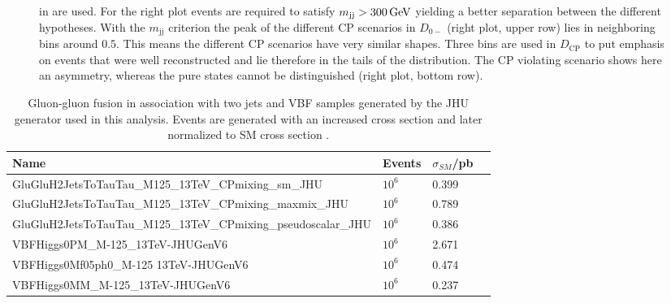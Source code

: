 \begin{figure}[h!]
{   in  are used. For the right plot events are required to satisfy $m_\text{jj}>\text{300\,{GeV}}$ yielding a better separation between the different hypotheses.
   With the $m_\text{jj}$ criterion the peak of the different CP scenarios in $D_{0-}$ (right plot, upper row) lies in neighboring bins around $\text{0.5}$. This means the different CP scenarios have very similar shapes. Three bins are used in $D_\text{CP}$ to put emphasis on events that were well reconstructed and lie therefore in the tails of the distribution.  
   The CP violating scenario shows here an asymmetry, whereas the pure states cannot be distinguished (right plot, bottom row).}\label{ES:dcpstar_shapes}%
\end{figure}%
\newpage{}
\begin{table}[h]
    \centering
    \caption[Simulated JHU signal samples.]{Gluon-gluon fusion in association with two jets and VBF samples generated by the JHU generator used in this analysis. Events
    are generated with an increased cross section and later normalized to SM cross section \cite{Patrignani:2016xqp}.}\label{ES:jhu_samples_xsecs} 
    \begin{tabular}{llll}
        \toprule
        Name                                              & Events &  $\sigma_{SM}$/pb \\
        \midrule
        { GluGluH2JetsToTauTau\_M125\_13TeV\_CPmixing\_sm\_JHU          }  & $\text{10}^\text{6}$ & 0.399 \\
        { GluGluH2JetsToTauTau\_M125\_13TeV\_CPmixing\_maxmix\_JHU      }  & $\text{10}^\text{6}$ & 0.789 \\
        { GluGluH2JetsToTauTau\_M125\_13TeV\_CPmixing\_pseudoscalar\_JHU}  & $\text{10}^\text{6}$ & 0.386 \\
        \midrule
        { VBFHiggs0PM\_M-125\_13TeV-JHUGenV6           }                   & $\text{10}^\text{6}$ & 2.671 \\
        { VBFHiggs0Mf05ph0\_M-125 13TeV-JHUGenV6       }                   & $\text{10}^\text{6}$ & 0.474 \\
        { VBFHiggs0MM\_M-125\_13TeV-JHUGenV6           }                   & $\text{10}^\text{6}$ & 0.237 \\ \bottomrule
    \end{tabular}%
\end{table}%


